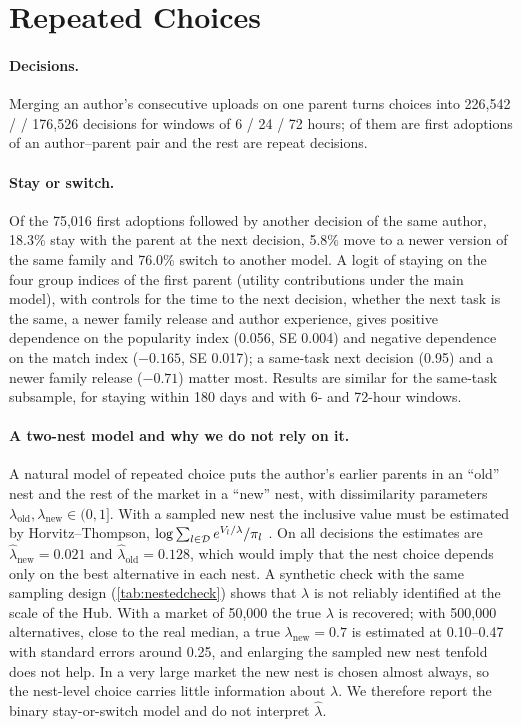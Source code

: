 \section{Repeated Choices}
\label{app:repeat}

\paragraph{Decisions.}
Merging an author's consecutive uploads on one parent turns \nChoices{} choices into 226,542 / \nDecisions{} /
176,526 decisions for windows of 6 / 24 / 72 hours; \nFirst{} of them are first adoptions of an author--parent pair
and the rest are repeat decisions.

\paragraph{Stay or switch.}
Of the 75,016 first adoptions followed by another decision of the same author, 18.3\% stay with the parent at the
next decision, 5.8\% move to a newer version of the same family and 76.0\% switch to another model. A logit of
staying on the four group indices of the first parent (utility contributions under the main model), with controls
for the time to the next decision, whether the next task is the same, a newer family release and author experience,
gives positive dependence on the popularity index (0.056, SE 0.004) and negative dependence on the match index
($-0.165$, SE 0.017); a same-task next decision (0.95) and a newer family release ($-0.71$) matter most. Results are
similar for the same-task subsample, for staying within 180 days and with 6- and 72-hour windows.

\paragraph{A two-nest model and why we do not rely on it.}
A natural model of repeated choice puts the author's earlier parents in an ``old'' nest and the rest of the market in
a ``new'' nest, with dissimilarity parameters $\lambda_{\text{old}}, \lambda_{\text{new}} \in (0,1]$. With a sampled new
nest the inclusive value must be estimated by Horvitz--Thompson, $\log \sum_{l \in \mathcal{D}} e^{V_l / \lambda} / \pi_l$
\citep{horvitz1952generalization}. On all \nDecisions{} decisions the estimates are $\hat\lambda_{\text{new}} =
0.021$ and $\hat\lambda_{\text{old}} = 0.128$, which would imply that the nest choice depends only on the best
alternative in each nest. A synthetic check with the same sampling design (\cref{tab:nestedcheck}) shows that
$\lambda$ is not reliably identified at the scale of the Hub. With a market of 50,000 the true $\lambda$ is recovered;
with 500,000 alternatives, close to the real median, a true $\lambda_{\text{new}} = 0.7$ is estimated at 0.10--0.47
with standard errors around 0.25, and enlarging the sampled new nest tenfold does not help. In a very large market
the new nest is chosen almost always, so the nest-level choice carries little information about $\lambda$. We
therefore report the binary stay-or-switch model and do not interpret $\hat\lambda$.

